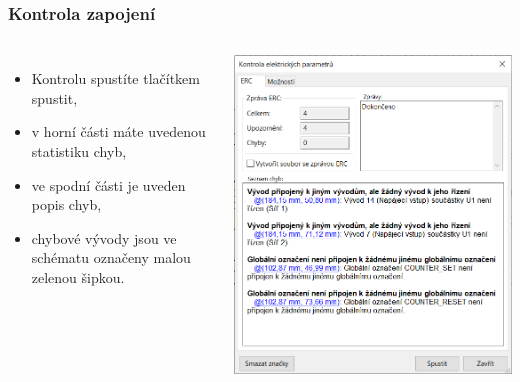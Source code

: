 \documentclass{beamer}
\begin{document}
\begin{frame}
	\frametitle{Kontrola zapojení}
	\begin{columns}
	
		\small
		\begin{itemize}
			\item Kontrolu spustíte tlačítkem spustit,
			\item v horní části máte uvedenou statistiku chyb,
			\item ve spodní části je uveden popis chyb,
			\item chybové vývody jsou ve schématu označeny malou zelenou šipkou.
		\end{itemize}
		
		\begin{center}
			\includegraphics[width=\textwidth]{obr/kontrola04.png}
		\end{center}
		
	\end{columns}
\end{frame}
\end{document}
